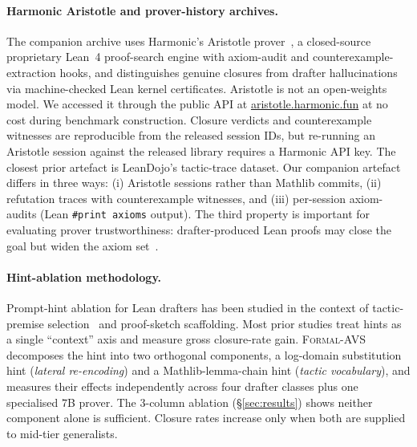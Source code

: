 \paragraph{Harmonic Aristotle and prover-history archives.}
The companion archive uses Harmonic's Aristotle
prover~\cite{aristotle2025}, a closed-source proprietary Lean~4
proof-search engine with axiom-audit and counterexample-extraction
hooks, and distinguishes genuine closures from drafter
hallucinations via machine-checked Lean kernel certificates.
Aristotle is not an open-weights model. We accessed it through
the public API at \url{aristotle.harmonic.fun} at no cost during
benchmark construction. Closure verdicts and counterexample
witnesses are reproducible from the released session IDs, but
re-running an Aristotle session against the released library
requires a Harmonic API key. The closest prior
artefact is LeanDojo's tactic-trace dataset. Our companion artefact
differs in three ways: (i) Aristotle sessions rather than Mathlib
commits, (ii) refutation traces with counterexample witnesses, and
(iii) per-session axiom-audits (Lean \texttt{\#print axioms}
output). The third property is important for evaluating prover
trustworthiness: drafter-produced Lean proofs may close the goal but
widen the axiom set~\cite{yang2023leandojo}.

\paragraph{Hint-ablation methodology.}
Prompt-hint ablation for Lean drafters has been studied in the
context of tactic-premise selection~\cite{polu2020gpt, han2022proof,
jiang2023draftsketchandprove} and proof-sketch scaffolding. Most
prior studies treat hints as a single ``context'' axis and measure
gross closure-rate gain. \textsc{Formal-AVS} decomposes the hint
into two orthogonal components, a log-domain substitution hint
(\emph{lateral re-encoding}) and a Mathlib-lemma-chain hint
(\emph{tactic vocabulary}), and measures their effects independently
across four drafter classes plus one specialised $7$B prover. The
3-column ablation (\S\ref{sec:results}) shows neither component alone
is sufficient. Closure rates increase only when both are supplied to
mid-tier generalists.

